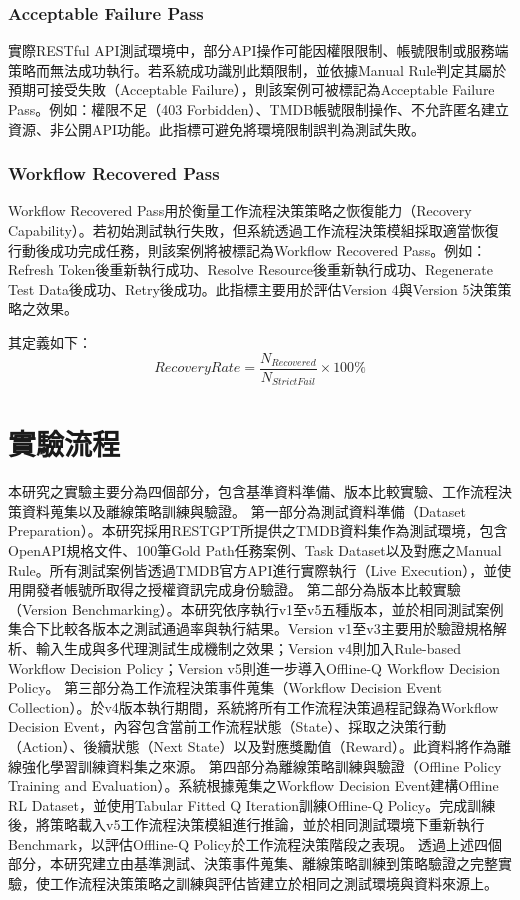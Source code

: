 \begin{ZhChapter}
\subsubsection{Acceptable Failure Pass}
\text 實際RESTful API測試環境中，部分API操作可能因權限限制、帳號限制或服務端策略而無法成功執行。若系統成功識別此類限制，並依據Manual Rule判定其屬於預期可接受失敗（Acceptable Failure），則該案例可被標記為Acceptable Failure Pass。例如：權限不足（403 Forbidden）、TMDB帳號限制操作、不允許匿名建立資源、非公開API功能。此指標可避免將環境限制誤判為測試失敗。

\subsubsection{Workflow Recovered Pass}
\text Workflow Recovered Pass用於衡量工作流程決策策略之恢復能力（Recovery Capability）。若初始測試執行失敗，但系統透過工作流程決策模組採取適當恢復行動後成功完成任務，則該案例將被標記為Workflow Recovered Pass。例如：Refresh Token後重新執行成功、Resolve Resource後重新執行成功、Regenerate Test Data後成功、Retry後成功。此指標主要用於評估Version 4與Version 5決策策略之效果。

其定義如下：
\begin{equation}
RecoveryRate=
\frac{N_{Recovered}}
{N_{StrictFail}}
\times100\%
\end{equation}

\section{實驗流程}

\text 本研究之實驗主要分為四個部分，包含基準資料準備、版本比較實驗、工作流程決策資料蒐集以及離線策略訓練與驗證。
\text 第一部分為測試資料準備（Dataset Preparation）。本研究採用RESTGPT所提供之TMDB資料集作為測試環境，包含OpenAPI規格文件、100筆Gold Path任務案例、Task Dataset以及對應之Manual Rule。所有測試案例皆透過TMDB官方API進行實際執行（Live Execution），並使用開發者帳號所取得之授權資訊完成身份驗證。
\text 第二部分為版本比較實驗（Version Benchmarking）。本研究依序執行v1至v5五種版本，並於相同測試案例集合下比較各版本之測試通過率與執行結果。Version v1至v3主要用於驗證規格解析、輸入生成與多代理測試生成機制之效果；Version v4則加入Rule-based Workflow Decision Policy；Version v5則進一步導入Offline-Q Workflow Decision Policy。
\text 第三部分為工作流程決策事件蒐集（Workflow Decision Event Collection）。於v4版本執行期間，系統將所有工作流程決策過程記錄為Workflow Decision Event，內容包含當前工作流程狀態（State）、採取之決策行動（Action）、後續狀態（Next State）以及對應獎勵值（Reward）。此資料將作為離線強化學習訓練資料集之來源。
\text 第四部分為離線策略訓練與驗證（Offline Policy Training and Evaluation）。系統根據蒐集之Workflow Decision Event建構Offline RL Dataset，並使用Tabular Fitted Q Iteration訓練Offline-Q Policy。完成訓練後，將策略載入v5工作流程決策模組進行推論，並於相同測試環境下重新執行Benchmark，以評估Offline-Q Policy於工作流程決策階段之表現。
\text 透過上述四個部分，本研究建立由基準測試、決策事件蒐集、離線策略訓練到策略驗證之完整實驗，使工作流程決策策略之訓練與評估皆建立於相同之測試環境與資料來源上。


\end{ZhChapter}
